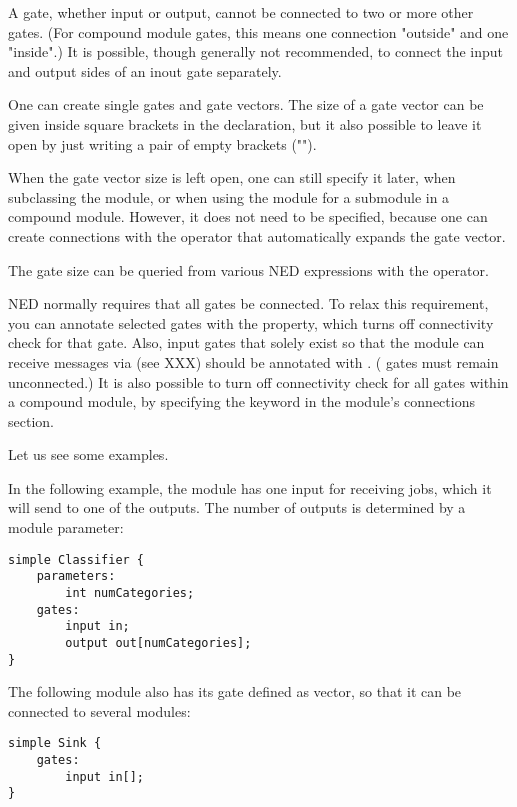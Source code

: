 A gate, whether input or output, cannot be connected to two or more other
gates. (For compound module gates, this means one connection "outside" and
one "inside".)  It is possible, though generally not recommended, to
connect the input and output sides of an inout gate separately.

One can create single gates and gate vectors. The size of a gate vector
can be given inside square brackets in the declaration, but it also possible
to leave it open by just writing a pair of empty brackets ("\ttt{[]}").

When the gate vector size is left open, one can still specify it later,
when subclassing the module, or when using the module for a submodule in a
compound module. However, it does not need to be specified, because
one can create connections with the  operator that
automatically expands the gate vector.

The gate size can be queried from various NED expressions with the
 operator.

NED normally requires that all gates be connected. To relax this
requirement, you can annotate selected gates with the 
property, which turns off connectivity check for that gate. Also, input
gates that solely exist so that the module can receive messages via
 (see XXX) should be annotated with .
( gates must remain unconnected.) It is also possible
to turn off connectivity check for all gates within a compound module, by
specifying the  keyword in the module's
connections section.

Let us see some examples.

In the following example, the  module has one input for
receiving jobs, which it will send to one of the outputs. The number of
outputs is determined by a module parameter:

\begin{verbatim}
simple Classifier {
    parameters:
        int numCategories;
    gates:
        input in;
        output out[numCategories];
}
\end{verbatim}

The following  module also has its  gate defined
as vector, so that it can be connected to several modules:

\begin{verbatim}
simple Sink {
    gates:
        input in[];
}
\end{verbatim}

